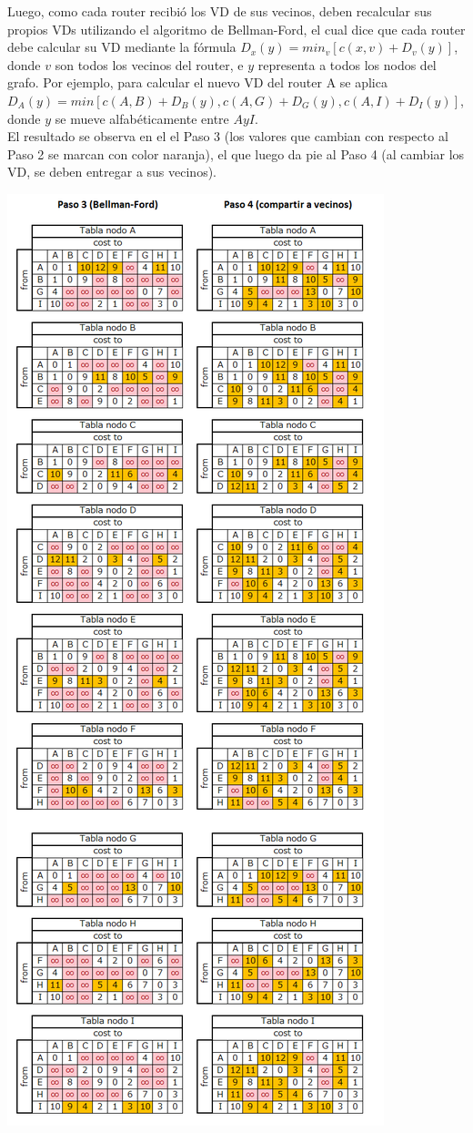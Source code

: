 \documentclass{article}
\begin{document}
Luego, como cada router recibió los VD de sus vecinos, deben recalcular sus propios VDs utilizando el algoritmo de Bellman-Ford, el cual dice que cada router debe calcular su VD mediante la fórmula $D_{x}(y) = min_{v}[c(x,v) + D_{v}(y)]$, donde $v$ son todos los vecinos del router, e $y$ representa a todos los nodos del grafo. Por ejemplo, para calcular el nuevo VD del router A se aplica $D_{A}(y) = min[c(A,B) + D_{B}(y), c(A,G) + D_{G}(y),c(A,I) + D_{I}(y)]$, donde $y$ se mueve alfabéticamente entre $A y I$.\\
El resultado se observa en el el Paso 3 (los valores que cambian con respecto al Paso 2 se marcan con color naranja), el que luego da pie al Paso 4 (al cambiar los VD, se deben entregar a sus vecinos).\\
\centerline{\includegraphics[scale=0.5]{Img/paso34.png}}\\
\end{document}
